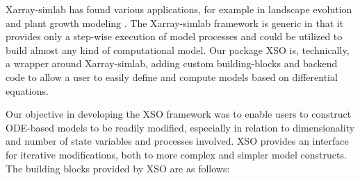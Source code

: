 \documentclass[gmd, manuscript]{copernicus}
\begin{document}
Xarray-simlab has found various applications, for example in landscape evolution \citep{Bovy2021Fastscape-lem/fastscape:V0.1.0beta3} and plant growth modeling \citep{Vaillant2022TowardsDevelopment}. The Xarray-simlab framework is generic in that it provides only a step-wise execution of model processes and could be utilized to build almost any kind of computational model. Our package XSO is, technically, a wrapper around Xarray-simlab, adding custom building-blocks and backend code to allow a user to easily define and compute models based on differential equations.

Our objective in developing the XSO framework was to enable users to construct ODE-based models to be readily modified, especially in relation to dimensionality and number of state variables and processes involved. XSO provides an interface for iterative modifications, both to more complex and simpler model constructs. The building blocks provided by XSO are as follows:
\end{document}
